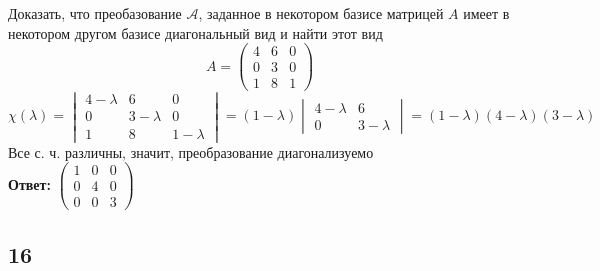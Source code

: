 Доказать, что преобазование $ \mathcal{A} $, заданное в некотором базисе матрицей $ A $ имеет в некотором другом базисе диагональный вид и найти этот вид
$$ A =
\begin{pmatrix}
	4 & 6 & 0 \\
    0 & 3 & 0 \\
    1 & 8 & 1
\end{pmatrix} $$
$$ \chi(\lambda) =
\begin{vmatrix}
    4 - \lambda & 6 & 0 \\
    0 & 3 - \lambda & 0 \\
    1 & 8 & 1 - \lambda
\end{vmatrix} = (1 - \lambda)
\begin{vmatrix}
    4 - \lambda & 6 \\
    0 & 3 - \lambda
\end{vmatrix} = (1 - \lambda)(4 - \lambda)(3 - \lambda) $$
Все с. ч. различны, значит, преобразование диагонализуемо \\
\textbf{Ответ:} $
\begin{pmatrix}
	1 & 0 & 0 \\
    0 & 4 & 0 \\
    0 & 0 & 3
\end{pmatrix} $

\subsection{16}

